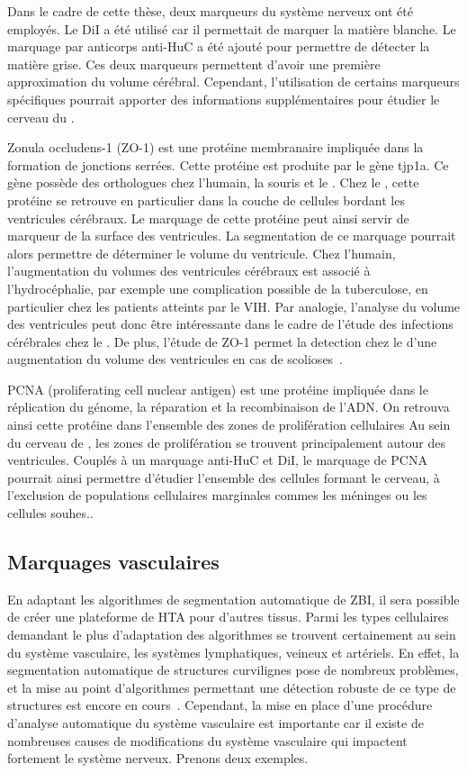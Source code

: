 \documentclass[\main/main.tex]{subfiles}
\begin{document}
%
Dans le cadre de cette thèse, deux marqueurs du système nerveux ont été employés.
%
Le DiI a été utilisé car il permettait de marquer la matière blanche.
%
Le marquage par anticorps anti-HuC a été ajouté pour permettre de détecter la matière grise.
%
Ces deux marqueurs permettent d'avoir une première approximation du volume cérébral.
%
Cependant, l'utilisation de certains marqueurs spécifiques pourrait apporter des informations supplémentaires pour étudier le cerveau du \pz{}.

%
Zonula occludens-1 (ZO-1) est une protéine membranaire impliquée dans la formation de jonctions serrées.
%
Cette protéine est produite par le gène tjp1a.
%
Ce gène possède des orthologues chez l'humain, la souris et le \pz{}.
%
Chez le \pz{}, cette protéine se retrouve en particulier dans la couche de cellules bordant les ventricules cérébraux.
%
Le marquage de cette protéine peut ainsi servir de marqueur de la surface des ventricules.
%
La segmentation de ce marquage pourrait alors permettre de déterminer le volume du ventricule.
%
Chez l'humain, l'augmentation du volumes des ventricules cérébraux est associé à l'hydrocéphalie, par exemple une complication possible de la tuberculose, en particulier chez les patients atteints par le VIH.
%
Par analogie, l'analyse du volume des ventricules peut donc être intéressante dans le cadre de l'étude des infections cérébrales chez le \pz{}.
%
De plus, l'étude de ZO-1 permet la detection chez le \pz{} d'une augmentation du volume des ventricules en cas de scolioses~\cite{vesque_2019}.

PCNA (proliferating cell nuclear antigen) est une protéine impliquée dans le réplication du génome, la réparation et la recombinaison de l'ADN.
%
On retrouva ainsi cette protéine dans l'ensemble des zones de prolifération cellulaires
%
Au sein du cerveau de \pz{}, les zones de prolifération se trouvent principalement autour des ventricules.
%
Couplés à un marquage anti-HuC et DiI, le marquage de PCNA pourrait ainsi permettre d'étudier l'ensemble des cellules formant le cerveau, à l'exclusion de populations cellulaires marginales commes les méninges ou les cellules souhes..

    \subsection{\label{chap:bio:marqueurs:vasc} Marquages vasculaires}

%
En adaptant les algorithmes de segmentation automatique de ZBI,
il sera possible de créer une plateforme de HTA pour d'autres tissus.
Parmi les types cellulaires demandant le plus d'adaptation des algorithmes se trouvent certainement au sein du système vasculaire, les systèmes lymphatiques, veineux et artériels.
%
En effet,
la segmentation automatique de structures curvilignes pose de nombreux problèmes,
et la mise au point d'algorithmes permettant une détection robuste de ce type de
structures est encore en cours~\cite{merveille_2019,mosinska_2020,mou_2019}.
%
Cependant, la mise en place d'une procédure d'analyse automatique du système vasculaire est importante car il existe de nombreuses causes de modifications du système vasculaire qui impactent fortement le système nerveux.
%
Prenons deux exemples.
\end{document}
